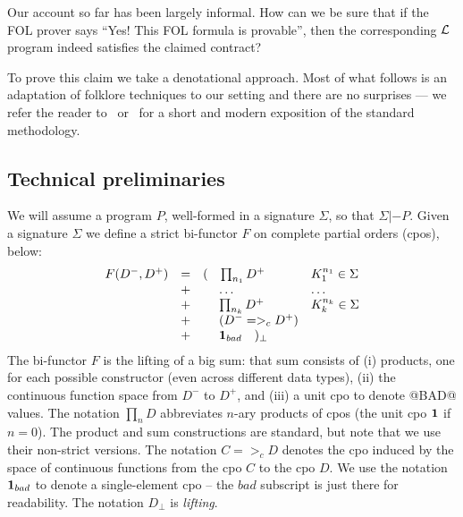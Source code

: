 Our account so far has been largely informal.  How can we be sure
that if the FOL prover says ``Yes!  This FOL formula is provable'', then
the corresponding $\cal L$ program indeed satisfies the claimed contract?

To prove this claim we take a denotational approach.  
Most of what follows is an adaptation of folklore techniques to
our setting and there are no surprises --- we refer the reader
to~\cite{winskel} or~\cite{benton+:coq-domains} for a short and modern
exposition of the standard methodology.

\subsection{Technical preliminaries}

We will assume a program $P$, well-formed in a signature $\Sigma$, so
that $\Sigma |- P$.  
Given a signature $\Sigma$ we define a strict
bi-functor $F$ on complete partial orders (cpos), below:
\[\begin{array}{lclll}
  F(D^{-},D^{+}) & = & ( \quad{\prod_{n_1}{D^{+}}} & K_1^{n_1} \in \Sigma \\
               & + & \;\quad\ldots                    & \ldots \\
               & + & \;\quad{\prod_{n_k}{D^{+}}} & K_k^{n_k} \in \Sigma \\ 
               & + & \;\quad(D^{-} =>_c D^{+}) \\
               & + & \;\quad{\sf{\bf 1}}_{bad} \quad )_{\bot}
\end{array}\]
The bi-functor $F$ is the lifting of a big sum: that sum consists of 
(i) products, one for each possible constructor (even across different data types), (ii) the continuous
function space from $D^{-}$ to $D^{+}$, and (iii) a unit cpo to denote @BAD@ values. 
The notation $\prod_{n}{D}$ abbreviates $n$-ary products of cpos (the unit cpo ${\sf{\bf 1}}$ if $n = 0$). 
The product and sum constructions are standard, but note that we use their non-strict versions. 
The notation $C =>_c D$ denotes the cpo 
induced by the space of continuous functions from the cpo $C$ to the cpo $D$. We use 
the notation ${\sf{\bf 1}}_{bad}$ to 
denote a single-element cpo -- the $bad$ subscript is just there for readability. 
The notation $D_\bot$ is {\em lifting}.

